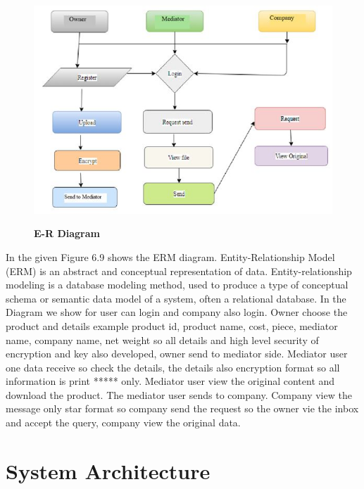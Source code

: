 \documentclass[BTech]{srmuthesis}
\begin{document}
\begin{figure}[H]
\centering
\includegraphics[scale=0.8]{er.jpg}
\label{fig:1}\hspace{10mm}
\caption{\textbf{E-R Diagram}}
\end{figure}
In the given Figure 6.9 shows the ERM diagram. Entity-Relationship Model (ERM) is an abstract and conceptual representation of data. Entity-relationship modeling is a database modeling method, used to produce a type of conceptual schema or semantic data model of a system, often a relational database. In the Diagram we show for user can login and company also login. Owner choose the product and details example product id, product name, cost, piece, mediator name, company name, net weight so all details and high level security of encryption and key also developed,  owner  send to mediator side. Mediator user one data receive so check the details, the details also encryption format so all information is print ***** only. Mediator user view the original content and download the product. The mediator user sends to company. Company view the message only star format so company send the request so the owner vie the inbox and accept the query, company view the original data.
\section{System Architecture}
\end{document}
